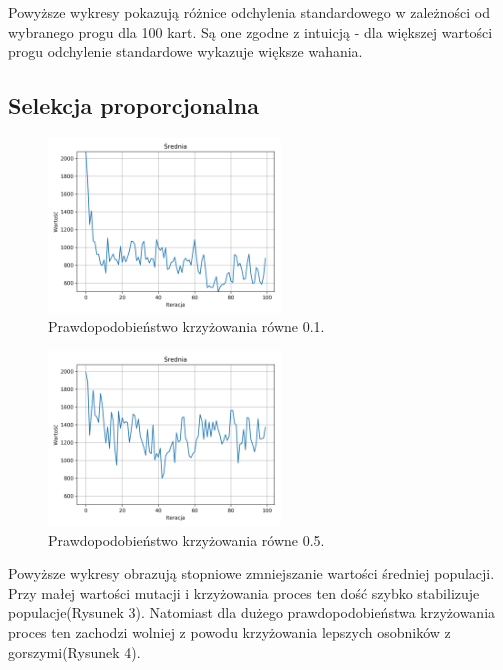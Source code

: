 \documentclass[12pt]{article}
\begin{document}
Powyższe wykresy pokazują różnice odchylenia standardowego w zależności od wybranego progu dla 100 kart. Są one zgodne z intuicją - dla większej wartości progu odchylenie standardowe wykazuje większe wahania. 

\newpage

\subsection{Selekcja proporcjonalna}


\begin{figure}[ht]
	\centering					\includegraphics[width=0.55\textwidth]{roulette_1.png}
	\caption{Prawdopodobieństwo krzyżowania równe 0.1.}
	\label{fig1}
\end{figure}


\begin{figure}[ht]
	\centering					\includegraphics[width=0.55\textwidth]{roulette_2.png}
	\caption{Prawdopodobieństwo krzyżowania równe 0.5.}
	\label{fig1}
\end{figure}

Powyższe wykresy obrazują stopniowe zmniejszanie wartości średniej populacji. Przy małej wartości mutacji i krzyżowania proces ten dość szybko stabilizuje populacje(Rysunek 3). Natomiast dla dużego prawdopodobieństwa krzyżowania proces ten zachodzi wolniej z powodu krzyżowania lepszych osobników z gorszymi(Rysunek 4). 

\newpage
\end{document}
